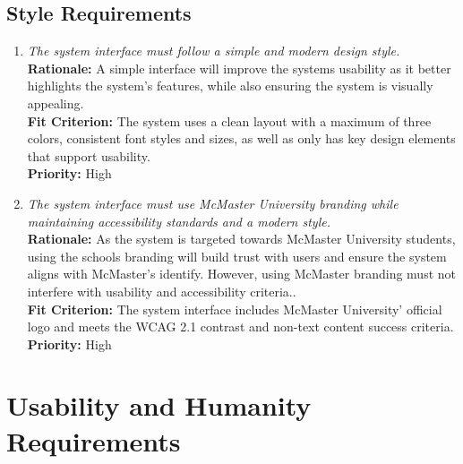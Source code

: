 \documentclass[12pt]{article}
\begin{document}
\subsection{Style Requirements}
\begin{enumerate}[label=LFR-SR \arabic*., wide=0pt, leftmargin=*]
\item \emph{The system interface must follow a simple and modern design style.}\\[2mm] 
    {\bf Rationale:} A simple interface will improve the systems usability as it better highlights the system's features, while also ensuring the system is visually appealing.\\
    {\bf Fit Criterion:} The system uses a clean layout with a maximum of three colors, consistent font styles and sizes, as well as only has key design elements that support usability. \\
    {\bf Priority:} High
\item \emph{The system interface must use McMaster University branding while maintaining accessibility standards and a modern style.}\\[2mm] 
    {\bf Rationale:} As the system is targeted towards McMaster University students, using the schools branding will build trust with users and ensure the system aligns with McMaster's identify. However, using McMaster branding must not interfere with usability and accessibility criteria..\\
    {\bf Fit Criterion:} The system interface includes McMaster University' official logo and meets the WCAG 2.1 contrast and non-text content success criteria. \\
    {\bf Priority:} High
\end{enumerate}


\section{Usability and Humanity Requirements}
\end{document}
